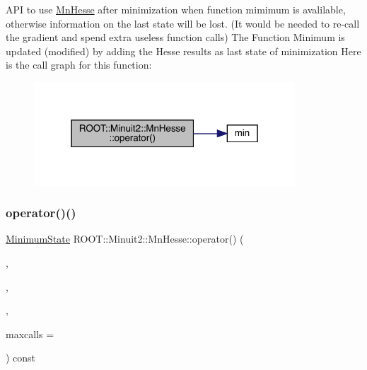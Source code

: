 A\+PI to use \mbox{\hyperlink{classROOT_1_1Minuit2_1_1MnHesse}{Mn\+Hesse}} after minimization when function mimimum is avalilable, otherwise information on the last state will be lost. (It would be needed to re-\/call the gradient and spend extra useless function calls) The Function Minimum is updated (modified) by adding the Hesse results as last state of minimization Here is the call graph for this function\+:\nopagebreak
\begin{figure}[H]
\begin{center}
\leavevmode
\includegraphics[width=277pt]{d1/d02/classROOT_1_1Minuit2_1_1MnHesse_a3b6ba68a41260029bc6bde433170e600_cgraph}
\end{center}
\end{figure}
\mbox{\label{classROOT_1_1Minuit2_1_1MnHesse_a4130de0190695811a4606f8ab229482d}} 
\subsubsection{\texorpdfstring{operator()()}{operator()()}\hspace{0.1cm}{\footnotesize\ttfamily [15/16]}}
{\footnotesize\ttfamily \mbox{\hyperlink{classROOT_1_1Minuit2_1_1MinimumState}{Minimum\+State}} R\+O\+O\+T\+::\+Minuit2\+::\+Mn\+Hesse\+::operator() (\begin{DoxyParamCaption}\item[{const \mbox{\hyperlink{classROOT_1_1Minuit2_1_1MnFcn}{Mn\+Fcn}} \&}]{,  }\item[{const \mbox{\hyperlink{classROOT_1_1Minuit2_1_1MinimumState}{Minimum\+State}} \&}]{,  }\item[{const \mbox{\hyperlink{classROOT_1_1Minuit2_1_1MnUserTransformation}{Mn\+User\+Transformation}} \&}]{,  }\item[{unsigned int}]{maxcalls = {} }\end{DoxyParamCaption}) const}

